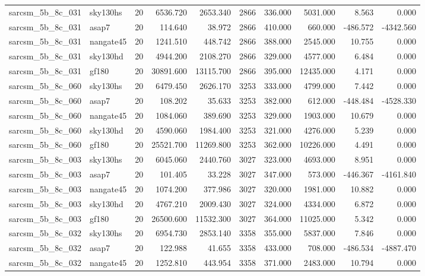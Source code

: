 \begin{longtable}{llrrrrrrrr}
sarcsm\_5b\_8c\_031 & sky130hs & 20 & 6536.720 & 2653.340 & 2866 & 336.000 & 5031.000 & 8.563 & 0.000 \\
sarcsm\_5b\_8c\_031 & asap7 & 20 & 114.640 & 38.972 & 2866 & 410.000 & 660.000 & -486.572 & -4342.560 \\
sarcsm\_5b\_8c\_031 & nangate45 & 20 & 1241.510 & 448.742 & 2866 & 388.000 & 2545.000 & 10.755 & 0.000 \\
sarcsm\_5b\_8c\_031 & sky130hd & 20 & 4944.200 & 2108.270 & 2866 & 329.000 & 4577.000 & 6.484 & 0.000 \\
sarcsm\_5b\_8c\_031 & gf180 & 20 & 30891.600 & 13115.700 & 2866 & 395.000 & 12435.000 & 4.171 & 0.000 \\
sarcsm\_5b\_8c\_060 & sky130hs & 20 & 6479.450 & 2626.170 & 3253 & 333.000 & 4799.000 & 7.442 & 0.000 \\
sarcsm\_5b\_8c\_060 & asap7 & 20 & 108.202 & 35.633 & 3253 & 382.000 & 612.000 & -448.484 & -4528.330 \\
sarcsm\_5b\_8c\_060 & nangate45 & 20 & 1084.060 & 389.690 & 3253 & 329.000 & 1903.000 & 10.679 & 0.000 \\
sarcsm\_5b\_8c\_060 & sky130hd & 20 & 4590.060 & 1984.400 & 3253 & 321.000 & 4276.000 & 5.239 & 0.000 \\
sarcsm\_5b\_8c\_060 & gf180 & 20 & 25521.700 & 11269.800 & 3253 & 362.000 & 10226.000 & 4.491 & 0.000 \\
sarcsm\_5b\_8c\_003 & sky130hs & 20 & 6045.060 & 2440.760 & 3027 & 323.000 & 4693.000 & 8.951 & 0.000 \\
sarcsm\_5b\_8c\_003 & asap7 & 20 & 101.405 & 33.228 & 3027 & 347.000 & 573.000 & -446.367 & -4161.840 \\
sarcsm\_5b\_8c\_003 & nangate45 & 20 & 1074.200 & 377.986 & 3027 & 320.000 & 1981.000 & 10.882 & 0.000 \\
sarcsm\_5b\_8c\_003 & sky130hd & 20 & 4767.210 & 2009.430 & 3027 & 324.000 & 4334.000 & 6.872 & 0.000 \\
sarcsm\_5b\_8c\_003 & gf180 & 20 & 26500.600 & 11532.300 & 3027 & 364.000 & 11025.000 & 5.342 & 0.000 \\
sarcsm\_5b\_8c\_032 & sky130hs & 20 & 6954.730 & 2853.140 & 3358 & 355.000 & 5837.000 & 7.846 & 0.000 \\
sarcsm\_5b\_8c\_032 & asap7 & 20 & 122.988 & 41.655 & 3358 & 433.000 & 708.000 & -486.534 & -4887.470 \\
sarcsm\_5b\_8c\_032 & nangate45 & 20 & 1252.810 & 443.954 & 3358 & 371.000 & 2483.000 & 10.794 & 0.000 \\

\end{longtable}
